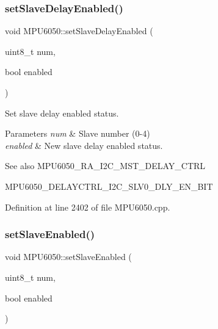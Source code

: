 \mbox{\label{classMPU6050_a471929d7cf9049357c345633d22412a9}} 
\subsubsection{\texorpdfstring{setSlaveDelayEnabled()}{setSlaveDelayEnabled()}}
{\footnotesize\ttfamily void M\+P\+U6050\+::set\+Slave\+Delay\+Enabled (\begin{DoxyParamCaption}\item[{uint8\+\_\+t}]{num,  }\item[{bool}]{enabled }\end{DoxyParamCaption})}



Set slave delay enabled status. 


\begin{DoxyParams}{Parameters}
{\em num} & Slave number (0-\/4) \\
\hline
{\em enabled} & New slave delay enabled status. \\
\hline
\end{DoxyParams}
\begin{DoxySeeAlso}{See also}
M\+P\+U6050\+\_\+\+R\+A\+\_\+\+I2\+C\+\_\+\+M\+S\+T\+\_\+\+D\+E\+L\+A\+Y\+\_\+\+C\+T\+RL 

M\+P\+U6050\+\_\+\+D\+E\+L\+A\+Y\+C\+T\+R\+L\+\_\+\+I2\+C\+\_\+\+S\+L\+V0\+\_\+\+D\+L\+Y\+\_\+\+E\+N\+\_\+\+B\+IT 
\end{DoxySeeAlso}


Definition at line 2402 of file M\+P\+U6050.\+cpp.

\mbox{\label{classMPU6050_afaffa021d7bb41f3a288827080602eee}} 
\subsubsection{\texorpdfstring{setSlaveEnabled()}{setSlaveEnabled()}}
{\footnotesize\ttfamily void M\+P\+U6050\+::set\+Slave\+Enabled (\begin{DoxyParamCaption}\item[{uint8\+\_\+t}]{num,  }\item[{bool}]{enabled }\end{DoxyParamCaption})}



